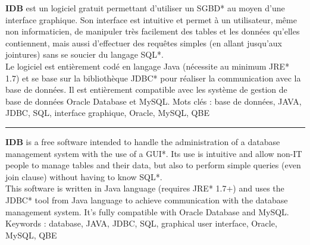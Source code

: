 \textbf{IDB} est un logiciel gratuit permettant d'utiliser un SGBD* au moyen d'une interface graphique. Son interface est intuitive et permet à un utilisateur, même non informaticien, de manipuler très facilement des tables et les données qu'elles contiennent, mais aussi d'effectuer des requêtes simples (en allant jusqu'aux jointures) sans se soucier du langage SQL*.
\\
Le logiciel est entièrement codé en langage Java (nécessite au minimum JRE* 1.7) et se base sur la bibliothèque JDBC* pour réaliser la communication avec la base de données. Il est entièrement compatible avec les système de gestion de base de données Oracle Database et MySQL.
\bigbreak
Mots clés : base de données, JAVA, JDBC, SQL, interface graphique, Oracle, MySQL, QBE

\bigbreak
\rule{\linewidth}{0.4pt}
\bigbreak

\textbf{IDB} is a free software intended to handle the administration of a database management system with the use of a GUI*. Its use is intuitive and allow non-IT people to manage tables and their data, but also to perform simple queries (even join clause) without having to know SQL*.
\\
This software is written in Java language (requires JRE* 1.7+) and uses the JDBC* tool from Java language to achieve communication with the database management system. It's fully compatible with Oracle Database and MySQL.
\bigbreak
Keywords : database, JAVA, JDBC, SQL, graphical user interface, Oracle, MySQL, QBE
